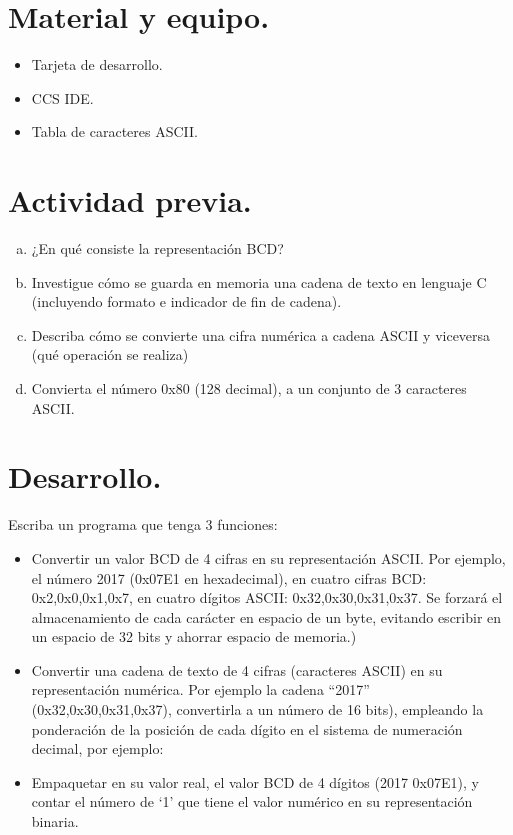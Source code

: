 \documentclass[a4paper,11pt]{article}                 %
\begin{document}
\section{Material y equipo.}
 
\begin{itemize}
	\item Tarjeta de desarrollo.
	\item CCS IDE.
	\item Tabla de caracteres ASCII. 
\end{itemize}
  

  
\section{Actividad previa.}                   

\begin{enumerate}[a)]

\item ¿En qué consiste la representación BCD? 

\item  Investigue cómo se guarda en memoria una cadena de texto en lenguaje C (incluyendo formato e indicador  de fin de cadena). 

\item  Describa cómo se convierte una cifra numérica a cadena ASCII y viceversa (qué operación se realiza)

\item  Convierta el número 0x80 (128 decimal), a un conjunto de 3 caracteres ASCII. 
	
\end{enumerate}


 \section{Desarrollo.}

Escriba un programa que tenga 3 funciones: 

\begin{itemize}
	\item  Convertir un valor BCD de 4 cifras en su representación ASCII. Por ejemplo, el número 2017 (0x07E1 en hexadecimal), en cuatro cifras BCD: 0x2,0x0,0x1,0x7, en cuatro dígitos ASCII: 0x32,0x30,0x31,0x37. Se forzará el almacenamiento de cada carácter en espacio de un byte, evitando escribir en un espacio de 32 bits y ahorrar espacio de memoria.) 
	\item  Convertir una cadena de texto de 4 cifras (caracteres ASCII) en su representación numérica. Por ejemplo la cadena “2017” (0x32,0x30,0x31,0x37), convertirla a un número de 16 bits), empleando la ponderación de la posición de cada dígito en el sistema de numeración decimal, por ejemplo:   
	
	\item  Empaquetar en su valor real, el valor BCD de 4 dígitos (2017 0x07E1), y contar el número de ‘1’ que tiene el valor numérico en su representación binaria.  
\end{itemize}
\end{document}
